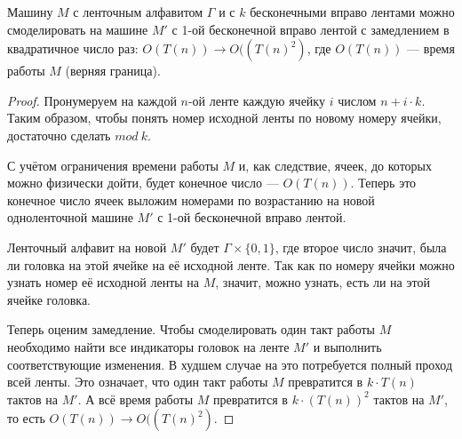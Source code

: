 
\begin{lemma} Машину $M$ с ленточным алфавитом $\Gamma$ и с $k$ бесконечными вправо лентами можно смоделировать на машине $M'$ с 1-ой бесконечной вправо лентой с замедлением в квадратичное число раз: $O(T(n)) \rightarrow O((T(n)^2)$, где $O(T(n))$ — время работы $M$ (верняя граница).
\end{lemma}

\begin{proof} \par
Пронумеруем на каждой $n\text{-ой}$ ленте каждую ячейку $i$ числом $n + i \cdot k$. Таким образом, чтобы понять номер исходной ленты по новому номеру ячейки, достаточно сделать $mod\ k$.

С учётом ограничения времени работы $M$ и, как следствие, ячеек, до которых можно физически дойти, будет конечное число — $O(T(n))$. Теперь это конечное число ячеек выложим номерами по возрастанию на новой одноленточной машине $M'$ с 1-ой бесконечной вправо лентой.

Ленточный алфавит на новой $M'$ будет $\Gamma \times \{0, 1\}$, где второе число значит, была ли головка на этой ячейке на её исходной ленте. Так как по номеру ячейки можно узнать номер её исходной ленты на $M$, значит, можно узнать, есть ли на этой ячейке головка.


Теперь оценим замедление. Чтобы смоделировать один такт работы $M$ необходимо найти все индикаторы головок на ленте $M'$ и выполнить соответствующие изменения. В худшем случае на это потребуется полный проход всей ленты. Это означает, что один такт работы $M$ превратится в $k \cdot T(n)$ тактов на $M'$. А всё время работы $M$ превратится в $k \cdot (T(n))^2$ тактов на $M'$, то есть $O(T(n)) \rightarrow O((T(n)^2)$.
\end{proof}

